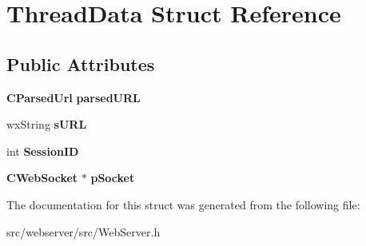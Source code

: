 \section{ThreadData Struct Reference}
\label{structThreadData}
\subsection*{Public Attributes}
\begin{DoxyCompactItemize}
\item 
{\bf CParsedUrl} {\bfseries parsedURL}\label{structThreadData_ae9e925c252ca28b01556cc95a4214d92}

\item 
wxString {\bfseries sURL}\label{structThreadData_af7ce59c83f8ecaf4b8af98f93f7f50b3}

\item 
int {\bfseries SessionID}\label{structThreadData_a5df72c93068632cb383a1ea67fcffcdd}

\item 
{\bf CWebSocket} $\ast$ {\bfseries pSocket}\label{structThreadData_a0fa832893927dcffabb224e4d77b564b}

\end{DoxyCompactItemize}


The documentation for this struct was generated from the following file:\begin{DoxyCompactItemize}
\item 
src/webserver/src/WebServer.h\end{DoxyCompactItemize}
